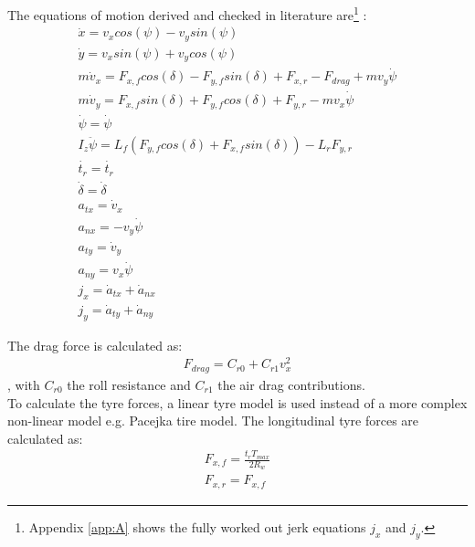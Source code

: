 The equations of motion derived and checked in literature \cite{TongDuySon2019} are\footnote{Appendix \ref{app:A} shows the fully worked out jerk equations $j_x$ and $j_y$.} :
\begin{equation}\label{eq:bicycle_model_eqmotion}
\begin{aligned}
\dot{x} = v_x cos(\psi) - v_y sin(\psi)\\
\dot{y} = v_x sin(\psi) + v_y cos(\psi)\\
m \dot{v}_x = F_{x,f} cos(\delta) - F_{y,f} sin(\delta) + F_{x,r} - F_{drag} + m v_y \dot{\psi}\\
m \dot{v}_y = F_{x,f} sin(\delta) + F_{y,f} cos(\delta) + F_{y,r} - m v_x \dot{\psi}\\
\dot{\psi} = \dot{\psi}\\
I_z \ddot{\psi} = L_f (F_{y,f} cos(\delta) + F_{x,f} sin(\delta)) - L_r F_{y,r}\\
\dot{t_r} = \dot{t_r}\\
\dot{\delta} = \dot{\delta}\\
a_{tx} = \dot{v}_x\\
a_{nx} = -v_y\dot{\psi}\\
a_{ty} = \dot{v}_y\\
a_{ny} = v_x\dot{\psi}\\
j_x = \dot{a}_{tx} + \dot{a}_{nx}\\
j_y = \dot{a}_{ty} + \dot{a}_{ny}
\end{aligned}
\end{equation}

The drag force is calculated as:
\begin{equation}\label{eq:bicycle_Fdrag}
\begin{aligned}
F_{drag} = C_{r0} + C_{r1} v_x^2
\end{aligned}
\end{equation},
with $C_{r0}$ the roll resistance and $C_{r1}$ the air drag contributions.\\

To calculate the tyre forces, a linear tyre model is used instead of a more complex non-linear model e.g. Pacejka tire model. The longitudinal tyre forces are calculated as:
\begin{equation}\label{eq:bicycle_Fx}
\begin{aligned}
F_{x,f} = \frac{t_r T_{max}}{2 R_w}\\
F_{x,r} = F_{x, f}
\end{aligned}
\end{equation}

